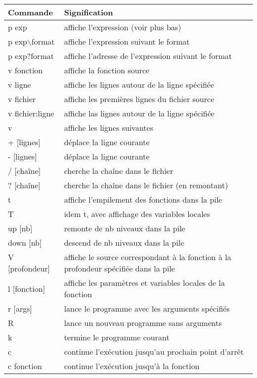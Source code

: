 {\renewcommand {\arraystretch} {1.05}
\begin {tabular} {|l|p{90mm}|}
    \hline \bf Commande & \bf Signification \\ \hline
p exp		& affiche l'expression (voir plus bas) \\
p exp$\backslash$format		& affiche l'expression suivant le format \\
p exp?format	& affiche l'adresse de l'expression suivant le format \\
    \hline
v fonction	& affiche la fonction source \\
v ligne		& affiche les lignes autour de la ligne spécifiée \\
v fichier	& affiche les premières lignes du fichier source \\
v fichier:ligne	& affiche las lignes autour de la ligne spécifiée \\
v		& affiche les lignes suivantes \\
+ [lignes]	& déplace la ligne courante \\
- [lignes]	& déplace la ligne courante \\
/ [chaîne]	& cherche la chaîne dans le fichier \\
? [chaîne]	& cherche la chaîne dans le fichier (en remontant) \\
    \hline
t		& affiche l'empilement des fonctions dans la pile \\
T		& idem t, avec affichage des variables locales \\
up [nb]		& remonte de nb niveaux dans la pile \\
down [nb]	& descend de nb niveaux dans la pile \\
V [profondeur]	& affiche le source correspondant à la fonction à la profondeur spécifiée dans la pile \\
l [fonction]	& affiche les paramètres et variables locales de la fonction \\
    \hline
r [args]	& lance le programme avec les arguments spécifiés \\
R		& lance un nouveau programme sans arguments \\
k		& termine le programme courant \\
    \hline
c		& continue l'exécution jusqu'au prochain point d'arrêt \\
c fonction	& continue l'exécution jusqu'à la fonction \\

\end{tabular}}
